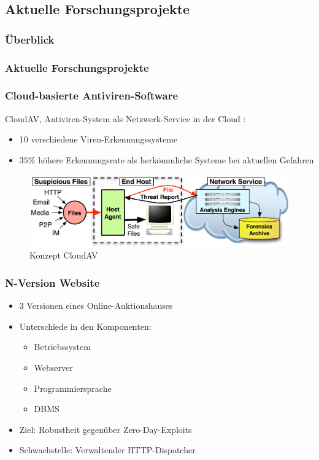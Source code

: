 \subsection{Aktuelle Forschungsprojekte}
%
%
\begin{frame}
	\frametitle{Überblick}
	\tableofcontents[currentsubsection]
\end{frame}
%
\begin{frame}
	\frametitle{Aktuelle Forschungsprojekte}
	
	
\end{frame}
%
%
\begin{frame}
	\frametitle{Cloud-basierte Antiviren-Software}
	
	CloudAV, Antiviren-System als Netzwerk-Service in der Cloud \cite{Oberheide:2008:CNA:1496711.1496718}: 
	\begin{itemize}
		\item 10 verschiedene Viren-Erkennungssysteme
		\item $35\%$ höhere Erkennungsrate als herkömmliche Systeme bei aktuellen Gefahren
	\end{itemize}
	\begin{figure}
		\includegraphics[scale=0.2]{grafiken/antivir.png}		
		\caption{Konzept CloudAV
			\footnotemark		
		}		
	\end{figure}
\end{frame}
%
%
\begin{frame}
	\frametitle{N-Version Website}

	\begin{itemize}
		\item 3 Versionen eines Online-Auktionshauses \cite{zero-day}
		\item Unterschiede in den Komponenten:
		\begin{itemize}
			\item Betriebssystem
			\item Webserver
			\item Programmiersprache
			\item DBMS
		\end{itemize}
		\item Ziel: Robustheit gegenüber Zero-Day-Exploits
		\item Schwachstelle: Verwaltender HTTP-Dispatcher

	\end{itemize}
	
\end{frame}
%